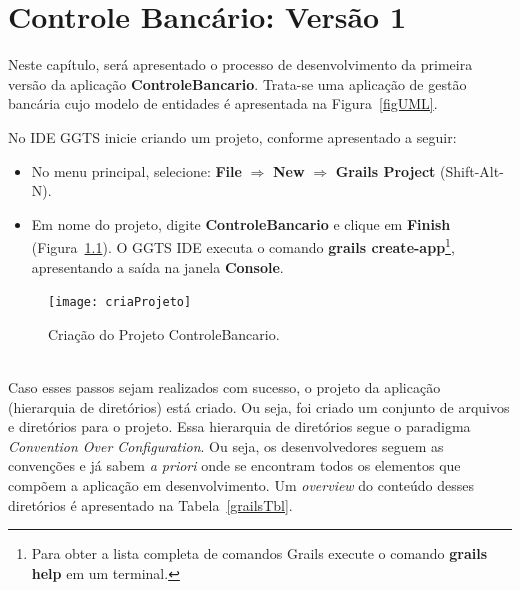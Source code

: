 \chapter{Controle Bancário: Versão 1}\label{bancario}

Neste  capítulo, será  apresentado  o processo  de  desenvolvimento da  primeira
versão  da aplicação {\bf  ControleBancario}. Trata-se  uma aplicação  de gestão
bancária cujo modelo de entidades é apresentada na Figura~\ref{figUML}.

No IDE GGTS inicie criando um projeto, conforme apresentado a seguir:

\vspace{0.5cm}

\begin{itemize}

\item  No menu  principal,  selecione: {\bf  File}  $\Longrightarrow$ {\bf  New}
  $\Longrightarrow$ {\bf Grails Project}  (Shift-Alt-N). 

\vspace{0.5cm}

\item Em nome do projeto, digite {\bf ControleBancario} e clique em {\bf Finish}
  (Figura~\ref{criaProjFig}).   O  GGTS  IDE   executa  o  comando  {\bf  grails
  create-app}\footnote{Para obter a lista  completa de comandos Grails execute o
  comando {\bf  grails help}  em um terminal.},  apresentando a saída  na janela
  {\bf Console}.

\end{itemize}

\begin{figure}[htbp]
\centering\texttt{[image: criaProjeto]}
\caption{Criação do Projeto ControleBancario.}
\label{criaProjFig}
\end{figure}

\hspace{1cm}\\  

Caso  esses  passos  sejam  realizados  com  sucesso,  o  projeto  da  aplicação
(hierarquia  de diretórios) está  criado.  Ou  seja, foi  criado um  conjunto de
arquivos e  diretórios para  o projeto.  Essa  hierarquia de diretórios  segue o
paradigma  {\it Convention  Over  Configuration}.  Ou  seja, os  desenvolvedores
seguem  as convenções  e já  sabem {\it  a priori}  onde se  encontram  todos os
elementos  que compõem  a aplicação  em desenvolvimento.   Um {\it  overview} do
conteúdo desses diretórios é apresentado na Tabela~\ref{grailsTbl}. 

